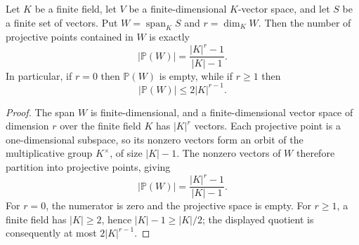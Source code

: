 \begin{helper}
Let $K$ be a finite field, let $V$ be a finite-dimensional $K$-vector space,
and let $S$ be a finite set of vectors.  Put
$W=\operatorname{span}_K S$ and $r=\dim_K W$.  Then the number of projective
points contained in $W$ is exactly
\[
 |\mathbb P(W)|=\frac{|K|^r-1}{|K|-1}.
\]
In particular, if $r=0$ then $\mathbb P(W)$ is empty, while if $r\geq1$
then
\[
 |\mathbb P(W)|\leq 2|K|^{r-1}.
\]
\end{helper}
\begin{proof}
The span $W$ is finite-dimensional, and a finite-dimensional vector space of
dimension $r$ over the finite field $K$ has $|K|^r$ vectors.  Each projective
point is a one-dimensional subspace, so its nonzero vectors form an orbit of
the multiplicative group $K^\times$, of size $|K|-1$.  The nonzero vectors
of $W$ therefore partition into projective points, giving
\[
 |\mathbb P(W)|=\frac{|K|^r-1}{|K|-1}.
\]
For $r=0$, the numerator is zero and the projective space is empty.  For
$r\geq1$, a finite field has $|K|\geq2$, hence
$|K|-1\geq |K|/2$; the displayed quotient is consequently at most
$2|K|^{r-1}$.
\end{proof}
